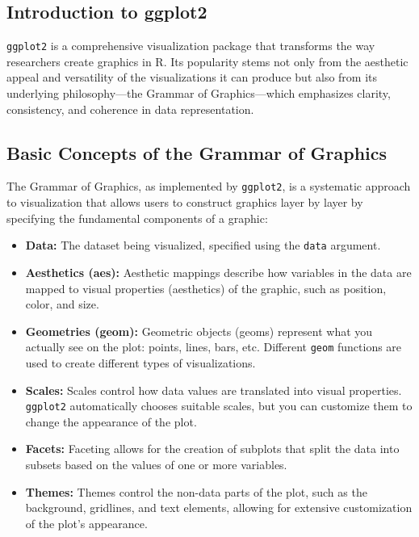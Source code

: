 \documentclass[
]{book}
\providecommand{\tightlist}{%
  \setlength{\itemsep}{0pt}\setlength{\parskip}{0pt}}
\begin{document}
\subsection*{Introduction to ggplot2}\label{introduction-to-ggplot2}

\texttt{ggplot2} is a comprehensive visualization package that transforms the way researchers create graphics in R. Its popularity stems not only from the aesthetic appeal and versatility of the visualizations it can produce but also from its underlying philosophy---the Grammar of Graphics---which emphasizes clarity, consistency, and coherence in data representation.

\subsection*{Basic Concepts of the Grammar of Graphics}\label{basic-concepts-of-the-grammar-of-graphics}

The Grammar of Graphics, as implemented by \texttt{ggplot2}, is a systematic approach to visualization that allows users to construct graphics layer by layer by specifying the fundamental components of a graphic:

\begin{itemize}
\tightlist
\item
  \textbf{Data:} The dataset being visualized, specified using the \texttt{data} argument.
\item
  \textbf{Aesthetics (aes):} Aesthetic mappings describe how variables in the data are mapped to visual properties (aesthetics) of the graphic, such as position, color, and size.
\item
  \textbf{Geometries (geom):} Geometric objects (geoms) represent what you actually see on the plot: points, lines, bars, etc. Different \texttt{geom} functions are used to create different types of visualizations.
\item
  \textbf{Scales:} Scales control how data values are translated into visual properties. \texttt{ggplot2} automatically chooses suitable scales, but you can customize them to change the appearance of the plot.
\item
  \textbf{Facets:} Faceting allows for the creation of subplots that split the data into subsets based on the values of one or more variables.
\item
  \textbf{Themes:} Themes control the non-data parts of the plot, such as the background, gridlines, and text elements, allowing for extensive customization of the plot's appearance.
\end{itemize}
\end{document}
